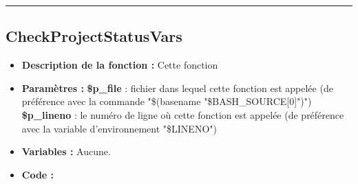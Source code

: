 \documentclass[a4paper,10pt]{article}
\begin{document}
\color{green}\par\noindent\rule{\textwidth}{0.4pt}\color{white}

\color{green}
\subsection{CheckProjectStatusVars}\color{white}
\begin{itemize}
    \item \textbf{Description de la fonction :} Cette fonction

    \item \textbf{Paramètres :}
        \color{orange}\textbf{\$p\_file}\color{white} : fichier dans lequel cette fonction est appelée (de préférence avec la commande "\$(\color{gray}basename \color{white}"\color{orange}\$BASH\_SOURCE[0]\color{white}")")
    \color{orange}\textbf{\$p\_lineno}\color{white} : le numéro de ligne où cette fonction est appelée (de préférence avec la variable d'environnement "\color{orange}\$LINENO\color{white}")

    \item \textbf{Variables :} Aucune.

    \item \textbf{Code :}
\end{itemize}
\end{document}
